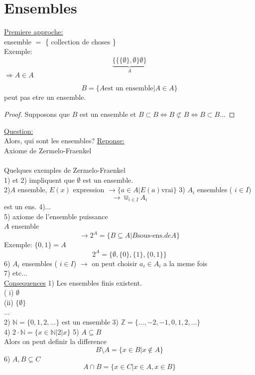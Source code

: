 \documentclass[../main.tex]{subfiles}
\begin{document}
\section{Ensembles}
\underline{Premiere approche:}\\
ensemble $=$ \{ collection de choses \}\\
Exemple:\\
\[ 
	\underbrace{ \{\{ \{\emptyset\}, \emptyset \}\emptyset\} }_{A}
\]
$\Rightarrow A \in A$ 
\begin{propo}\label{propo:paradoxe_de_russel}
\[ 
	B = \{ A \text{est un ensemble} \vert A \in A\}
\]
peut pas etre un ensemble.
\end{propo}
\begin{proof}
Supposons que $B$ est un ensemble et $B \subset B \iff B \not\subset B \iff B \subset B \ldots$ 
\end{proof}
\underline{Question:}\\
Alors, qui sont les ensembles?
\underline{Reponse:}\\
Axiome de Zermelo-Fraenkel\\
\hr\\
Quelques exemples de Zermelo-Fraenkel\\
1) et 2) impliquent que $\emptyset$ est un ensemble.\\
2)$A$ ensemble, $E(x)$ expression
$\rightarrow \{a \in A \vert E(a) \text{vrai}\}$
3) $A_i$ ensembles ( $i \in I$)\\
\[ 
	\rightarrow \Cup_{i\in I}  A_i
\]
est un ens.
4)...\\
5) axiome de l'ensemble puissance\\
$A$ ensemble
\[ 
	\rightarrow 2^{A} = \{ B \subseteq A \vert B \text{sous-ens.} de A\}
\]
Exemple: $\{0,1\}=A$ \\

\[ 
	2^{A} = \{ \emptyset , \{0\}, \{1\}, \{0,1\}\}
\]
6) $A_i$ ensembles ( $i \in I$)
$\rightarrow$ on peut choisir $a_i \in A_i$ a la meme fois\\
7) etc...\\
\underline{Consequences}
1) Les ensembles finis existent.\\
( i)  $\emptyset$ \\
 (ii)  $\{\emptyset\}$ \\
 ...\\

 2) $\mathbb{N} = \{0,1,2,\ldots\}$ est un ensemble
 3) $\mathbb{Z}= \{\ldots,-2,-1,0,1,2,\ldots\}$\\
 4) $2 \cdot \mathbb{N} = \{x \in \mathbb{N} \vert 2 \vert x\}$
 5) $A \subseteq B$ \\
 Alors on peut definir la difference
 \[ 
	 B \setminus A = \{x \in B \vert x \not\in A\}
 \]
 6) $A,B \subseteq C$ 
 \[ 
	 A \cap B = \{x \in C \vert x \in A, x \in B\} 
 \]
 
 
\end{document}
